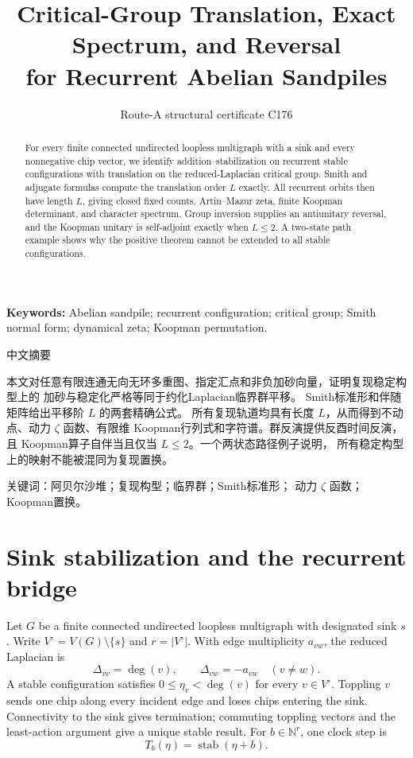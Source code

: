 \documentclass[10pt]{article}
\title{Critical-Group Translation, Exact Spectrum, and Reversal\\for Recurrent Abelian Sandpiles}
\author{Route-A structural certificate C176}
\date{}
\begin{document}
\maketitle
\begin{abstract}
For every finite connected undirected loopless multigraph with a sink and
every nonnegative chip vector, we identify addition--stabilization on
recurrent stable configurations with translation on the reduced-Laplacian
critical group. Smith and adjugate formulas compute the translation order
$L$ exactly. All recurrent orbits then have length $L$, giving closed fixed
counts, Artin--Mazur zeta, finite Koopman determinant, and character spectrum.
Group inversion supplies an antiunitary reversal, and the Koopman unitary is
self-adjoint exactly when $L\le2$. A two-state path example shows why the
positive theorem cannot be extended to all stable configurations.
\end{abstract}
\noindent\textbf{Keywords:} Abelian sandpile; recurrent configuration;
critical group; Smith normal form; dynamical zeta; Koopman permutation.

\begin{otherlanguage}{chinese-simplified}
\begin{center}{\large 中文摘要}\end{center}
本文对任意有限连通无向无环多重图、指定汇点和非负加砂向量，证明复现稳定构型上的
加砂与稳定化严格等同于约化\foreignlanguage{english}{Laplacian}临界群平移。
\foreignlanguage{english}{Smith}标准形和伴随矩阵给出平移阶 $L$ 的两套精确公式。
所有复现轨道均具有长度 $L$，从而得到不动点、动力 $\zeta$ 函数、有限维
\foreignlanguage{english}{Koopman}行列式和字符谱。群反演提供反酉时间反演，且
\foreignlanguage{english}{Koopman}算子自伴当且仅当 $L\le2$。一个两状态路径例子说明，
所有稳定构型上的映射不能被混同为复现置换。

\noindent 关键词：阿贝尔沙堆；复现构型；临界群；\foreignlanguage{english}{Smith}标准形；
动力 $\zeta$ 函数；\foreignlanguage{english}{Koopman}置换。
\end{otherlanguage}

\section{Sink stabilization and the recurrent bridge}
Let $G$ be a finite connected undirected loopless multigraph with designated
sink $s$. Write $V^\circ=V(G)\setminus\{s\}$ and $r=|V^\circ|$. With edge
multiplicity $a_{vw}$, the reduced Laplacian is
\[
\Delta_{vv}=\deg(v),\qquad \Delta_{vw}=-a_{vw}\quad(v\ne w).
\]
A stable configuration satisfies $0\le\eta_v<\deg(v)$ for every
$v\in V^\circ$. Toppling $v$ sends one chip along every incident edge and
loses chips entering the sink. Connectivity to the sink gives termination;
commuting toppling vectors and the least-action argument give a unique stable
result. For $b\in\mathbb N^r$, one clock step is
\[
T_b(\eta)=\operatorname{stab}(\eta+b).
\]
\end{document}
